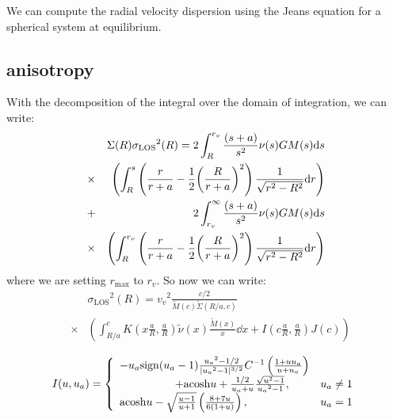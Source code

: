 We can compute the radial velocity dispersion using the Jeans equation for a
spherical system at equilibrium.

\subsection{\citet{ML+05} anisotropy}

With the decomposition of the integral over the domain of integration, we can
write:
%
\begin{eqnarray}
    &&\Sigma{(R)}{\sigma_\mathrm{LOS}}^2{(R)}=
        2\int_R^{r_v}{\frac{\left({s+a}\right)}{s^2}{\nu(s)}{G}{M(s)}}{{\rm{d}}{s}}
        \nonumber\\
    &\times&
        \left(\int_R^s{\left(\frac{r}{r+a}-\frac{1}{2}
        {\left(\frac{R}{r+a}\right)}^2\right)
        \frac{1}{\sqrt{r^2-R^2}}{\rm{d}}{r}}\right)\nonumber\\
    &+&2\int_{r_v}^{\infty}
        \frac{\left({s+a}\right)}{s^2}\nu(s){G}{M(s)}{\rm{d}}{s}\nonumber\\
    &\times&
        \left(\int_R^{r_v}
            \left(\frac{r}{r+a}-\frac{1}{2}{\left(\frac{R}{r+a}\right)}^2\right)
            \frac{1}{\sqrt{r^2-R^2}}{\rm{d}}{r}\right)\nonumber\\
\end{eqnarray}
%
where we are setting $r_{\max}$ to $r_v$. So now we can write:
%
\begin{eqnarray}
    &&{\sigma_\mathrm{LOS}}^2{(R)}={v_v}^2\frac{c/2}{\widetilde{M}{(c)}\widetilde{\Sigma}{(R/a,c)}}\nonumber\\
    &\times&\left(\int_{R/a}^c{{K}\left({x\frac{a}{R},\frac{a}{R}}\right)}\widetilde{\nu}{(x)}
    \frac{\widetilde{M}{(x)}}{x}\dd{x}+I\left({c\frac{a}{R},\frac{a}{R}}\right){J(c)}\right)\nonumber\\
\end{eqnarray}
%
\begin{equation}
    I(u,u_a)=\left\{\begin{array}{lr}
        -u_a{\rm{sign}}(u_a-1)\frac{{u_a}^2-1/2}{|{u_a}^2-1|^{3/2}}{C^{-1}\left(\frac{1+u{u_a}}{u+u_a}\right)}&\\
        \hspace{5em}+{\rm{acosh}}{u}+\frac{1/2}{u_a+u}\frac{\sqrt{u^2-1}}{{u_a}^2-1},&{u_a}\neq1\\
        {\rm{acosh}}{u}-\sqrt{\frac{u-1}{u+1}}\left(\frac{8+7u}{6(1+u)}\right),&{u_a}=1\\
    \end{array}\right.
\end{equation}

